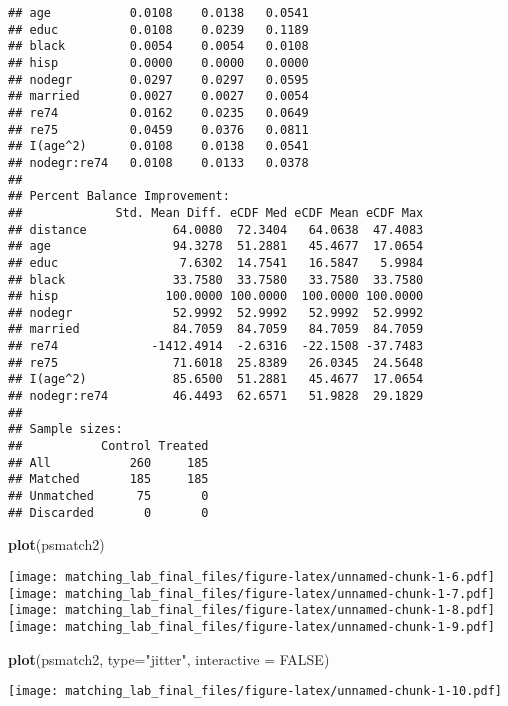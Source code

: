 \documentclass[]{article}
\newenvironment{Shaded}{\begin{snugshade}}{\end{snugshade}}
\newcommand{\DataTypeTok}[1]{\textcolor[rgb]{0.13,0.29,0.53}{#1}}
\newcommand{\KeywordTok}[1]{\textcolor[rgb]{0.13,0.29,0.53}{\textbf{#1}}}
\newcommand{\NormalTok}[1]{#1}
\newcommand{\OtherTok}[1]{\textcolor[rgb]{0.56,0.35,0.01}{#1}}
\newcommand{\StringTok}[1]{\textcolor[rgb]{0.31,0.60,0.02}{#1}}
\begin{document}
\begin{verbatim}
## age           0.0108    0.0138   0.0541
## educ          0.0108    0.0239   0.1189
## black         0.0054    0.0054   0.0108
## hisp          0.0000    0.0000   0.0000
## nodegr        0.0297    0.0297   0.0595
## married       0.0027    0.0027   0.0054
## re74          0.0162    0.0235   0.0649
## re75          0.0459    0.0376   0.0811
## I(age^2)      0.0108    0.0138   0.0541
## nodegr:re74   0.0108    0.0133   0.0378
## 
## Percent Balance Improvement:
##             Std. Mean Diff. eCDF Med eCDF Mean eCDF Max
## distance            64.0080  72.3404   64.0638  47.4083
## age                 94.3278  51.2881   45.4677  17.0654
## educ                 7.6302  14.7541   16.5847   5.9984
## black               33.7580  33.7580   33.7580  33.7580
## hisp               100.0000 100.0000  100.0000 100.0000
## nodegr              52.9992  52.9992   52.9992  52.9992
## married             84.7059  84.7059   84.7059  84.7059
## re74             -1412.4914  -2.6316  -22.1508 -37.7483
## re75                71.6018  25.8389   26.0345  24.5648
## I(age^2)            85.6500  51.2881   45.4677  17.0654
## nodegr:re74         46.4493  62.6571   51.9828  29.1829
## 
## Sample sizes:
##           Control Treated
## All           260     185
## Matched       185     185
## Unmatched      75       0
## Discarded       0       0
\end{verbatim}

\begin{Shaded}
\begin{Highlighting}[]
\KeywordTok{plot}\NormalTok{(psmatch2)}
\end{Highlighting}
\end{Shaded}

\texttt{[image: matching\_lab\_final\_files/figure-latex/unnamed-chunk-1-6.pdf]}
\texttt{[image: matching\_lab\_final\_files/figure-latex/unnamed-chunk-1-7.pdf]}
\texttt{[image: matching\_lab\_final\_files/figure-latex/unnamed-chunk-1-8.pdf]}
\texttt{[image: matching\_lab\_final\_files/figure-latex/unnamed-chunk-1-9.pdf]}

\begin{Shaded}
\begin{Highlighting}[]
\KeywordTok{plot}\NormalTok{(psmatch2, }\DataTypeTok{type=}\StringTok{"jitter"}\NormalTok{, }\DataTypeTok{interactive =} \OtherTok{FALSE}\NormalTok{)}
\end{Highlighting}
\end{Shaded}

\texttt{[image: matching\_lab\_final\_files/figure-latex/unnamed-chunk-1-10.pdf]}
\end{document}
